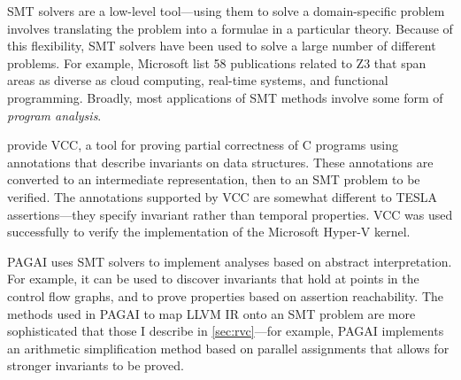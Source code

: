SMT solvers are a low-level tool---using them to solve a domain-specific
problem involves translating the problem into a formulae in a particular
theory. Because of this flexibility, SMT solvers have been used to solve
a large number of different problems. For example, Microsoft list 58
publications related to Z3 \cite{_publications:_????} that span areas as
diverse as cloud computing, real-time systems, and functional
programming. Broadly, most applications of SMT methods involve some form
of \emph{program analysis}.

\textcite{dahlweid_vcc:_2009} provide VCC, a tool for proving partial
correctness of C programs using annotations that describe invariants on data
structures. These annotations are converted to an intermediate representation,
then to an SMT problem to be verified. The annotations supported by VCC are
somewhat different to TESLA assertions---they specify invariant rather than
temporal properties. VCC was used successfully to verify the implementation of
the Microsoft Hyper-V kernel.

% 


PAGAI \cite{henry_pagai:_2012} uses SMT solvers to implement analyses based on
abstract interpretation. For example, it can be used to discover invariants that
hold at points in the control flow graphs, and to prove properties based on
assertion reachability. The methods used in PAGAI to map LLVM IR onto an SMT
problem are more sophisticated that those I describe in \autoref{sec:rvc}---for
example, PAGAI implements an arithmetic simplification method based on parallel
assignments that allows for stronger invariants to be proved.

